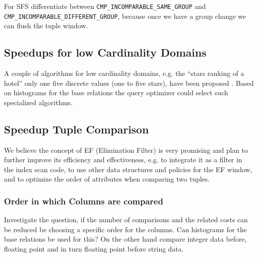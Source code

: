 For SFS differentiate between \texttt{CMP\_INCOMPARABLE\_SAME\_GROUP} and
\texttt{CMP\_INCOMPARABLE\_DIFFERENT\_GROUP}, because once we have
a group change we can flush the tuple window.


\subsection{Speedups for low Cardinality Domains}
A couple of algorithms for low cardinality domains, e.g.
the ``stars ranking of a hotel'' only one five discrete values (one
to five stars), have been proposed \citep{Preisinger2006,
Preisinger2007, Morse2007}.  Based on histograms for the base relations
the query optimizer could select such specialized algorithms.


\subsection{Speedup Tuple Comparison}
We believe the concept of EF (Elimination Filter) is very promising
and plan to further improve its efficiency and effectiveness, e.g. to
integrate it as a filter in the index scan code, to use other data
structures and policies for the EF window, and to optimize the order
of attributes when comparing two tuples.


\subsubsection{Order in which Columns are compared}
Investigate the question, if the number of comparisons and the related
costs can be reduced be choosing a specific order for the columns. Can
histograms for the base relations be used for this?  On the other hand
compare integer data before, floating point and in turn floating point
before string data.


%
%

